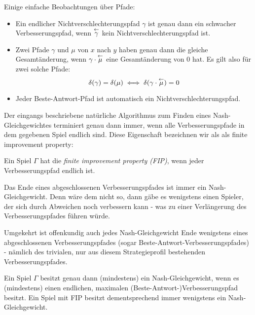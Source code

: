 \begin{beob}\label{beob:Pfade}
	Einige einfache Beobachtungen über Pfade:
	\begin{itemize}
		\item Ein endlicher Nichtverschlechterungspfad $\gamma$ ist genau dann ein schwacher Verbesserungspfad, wenn $\overset{\leftarrow}{\gamma}$ kein Nichtverschlechterungspfad ist. 
		
		\item Zwei Pfade $\gamma$ und $\mu$ von $x$ nach $y$ haben genau dann die gleiche Gesamtänderung, wenn $\gamma\cdot\overset{\leftarrow}{\mu}$ eine Gesamtänderung von $0$ hat. Es gilt also für zwei solche Pfade: 
		\[\delta(\gamma) = \delta(\mu) \iff \delta(\gamma\cdot\overset{\leftarrow}{\mu})=0 \]
		
		\item Jeder Beste-Antwort-Pfad ist automatisch ein Nichtverschlechterungspfad.
	\end{itemize}
\end{beob}

Der eingangs beschriebene natürliche Algorithmus zum Finden eines Nash-Gleichgewichtes terminiert genau dann immer, wenn alle Verbesserungspfade in dem gegebenen Spiel endlich sind. Diese Eigenschaft bezeichnen wir als als finite improvement property:

\begin{defn}
	Ein Spiel $\Gamma$ hat die \emph{finite improvement property (FIP)}, wenn jeder Verbesserungspfad endlich ist.
\end{defn}

\begin{beob}\label{beob:VerbPfadeundNGe}
	Das Ende eines abgeschlossenen Verbesserungspfades ist immer ein Nash-Gleichgewicht. Denn wäre dem nicht so, dann gäbe es wenigstens einen Spieler, der sich durch Abweichen noch verbessern kann - was zu einer Verlängerung des Verbesserungspfades führen würde. 
		
	Umgekehrt ist offenkundig auch jedes Nash-Gleichgewicht Ende wenigstens eines abgeschlossenen Verbesserungspfades (sogar Beste-Antwort-Verbesserungspfades) - nämlich des trivialen, nur aus diesem Strategieprofil bestehenden Verbesserungspfades.
\end{beob}

\begin{kor}\label{kor:ExVerbPfadExNG}
	Ein Spiel $\Gamma$ besitzt genau dann (mindestens) ein Nash-Gleichgewicht, wenn es (mindestens) einen endlichen, maximalen (Beste-Antwort-)Verbesserungspfad besitzt. Ein Spiel mit FIP besitzt dementsprechend immer wenigstens ein Nash-Gleichgewicht.
\end{kor}

